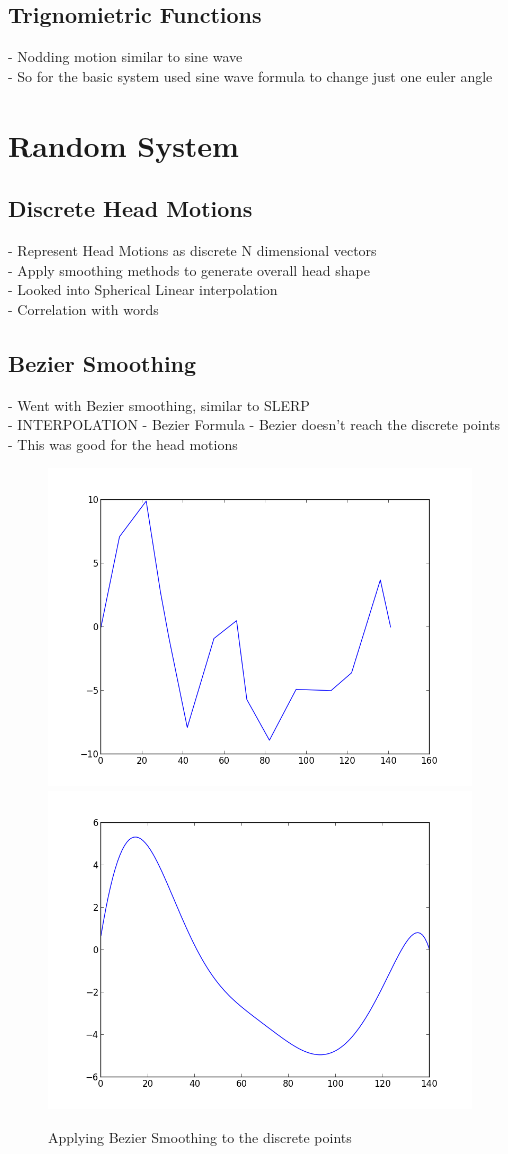 \documentclass[bsc,frontabs,twoside,singlespacing,parskip]{infthesis}
\begin{document}
\subsection{Trignomietric Functions}
- Nodding motion similar to sine wave \\
- So for the basic system used sine wave formula to change just one euler angle \\

\section{Random System}

\subsection{Discrete Head Motions}
- Represent Head Motions as discrete N dimensional vectors \\
- Apply smoothing methods to generate overall head shape \\
- Looked into Spherical Linear interpolation \\
\cite{rigid_head_motion}
- Correlation with words


\subsection{Bezier Smoothing}

- Went with Bezier smoothing, similar to SLERP\\
- INTERPOLATION
- Bezier Formula
- Bezier doesn't reach the discrete points\\
- This was good for the head motions \\

\begin{figure}
	\caption{Applying Bezier Smoothing to the discrete points}
	\includegraphics[width=.6\textwidth]{figure_1.png}
	\includegraphics[width=.6\textwidth]{figure_2.png}
\end{figure}
\end{document}
